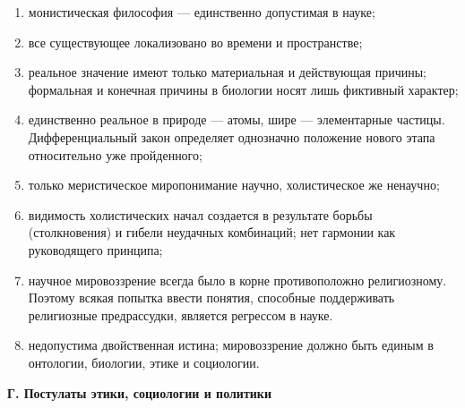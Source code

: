 \begin{enumerate}

  \item монистическая философия --- единственно допустимая в
        науке;

  \item все существующее локализовано во времени и пространстве;

  \item реальное значение имеют только материальная и действующая
        причины; формальная и конечная причины в биологии носят лишь
        фиктивный характер;

  \item единственно реальное в природе --- атомы, шире ---
        элементарные частицы. Дифференциальный закон определяет
        однозначно положение нового этапа относительно уже
        пройденного;

  \item только меристическое миропонимание научно, холистическое же
        ненаучно;

  \item видимость холистических начал создается в результате борьбы
        (столкновения) и гибели неудачных комбинаций; нет гармонии
        как руководящего принципа;

  \item научное мировоззрение всегда было в корне противоположно
        религиозному. Поэтому всякая попытка ввести понятия,
        способные поддерживать религиозные предрассудки, является
        регрессом в науке.

  \item недопустима двойственная истина; мировоззрение должно быть
        единым в онтологии, биологии, этике и социологии.

\end{enumerate}

\begin{center}

  \textbf{Г. Постулаты этики, социологии и политики}

\end{center}

